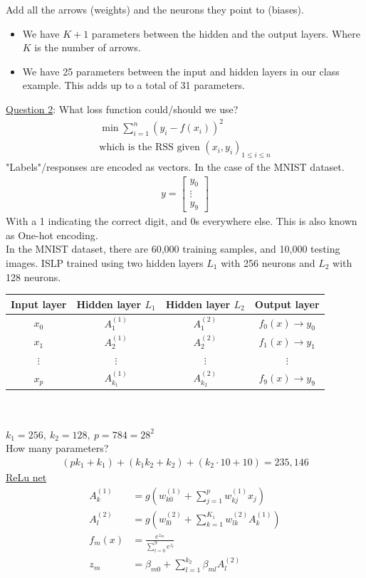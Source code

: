 \documentclass[12pt, letterpaper]{article}
\begin{document}
Add all the arrows (weights) and the neurons they point to (biases). 
\begin{itemize}
    \item We have $K + 1$ parameters between the hidden and the output layers. Where $K$ is 
    the number of arrows. 
    \item We have 25 parameters between the input and hidden layers in our class example. This
    adds up to a total of 31 parameters.
\end{itemize}
\underline{Question 2}: What loss function could/should we use?
\begin{align*}
    \min \sum_{i=1}^{n}(y_i - f(x_i))^2 \\
    \text{which is the RSS given } (x_i, y_i)_{1\le i \le n}
\end{align*}
"Labels"/responses are encoded as vectors. In the case of the MNIST dataset.
\begin{align*} y =
    \begin{bmatrix}
        y_0 \\ \vdots \\ y_9
    \end{bmatrix}
\end{align*}
With a 1 indicating the correct digit, and 0s everywhere else. This is also known as
One-hot encoding. \\ 
In the MNIST dataset, there are 60,000 training samples, and 10,000 testing images.
ISLP trained using two hidden layers $L_1$ with 256 neurons and $L_2$ with 128 neurons. \\

\begin{tabular}{c c c c}
    Input layer & Hidden layer $L_1$ & Hidden layer $L_2$ & Output layer \\
    \hline
    $x_0$ & $A_1^{(1)}$ & $A_1^{(2)}$ & $f_0(x) \rightarrow y_0$ \\
    $x_1$ & $A_2^{(1)}$ & $A_2^{(2)}$ & $f_1(x) \rightarrow y_1$ \\
    $\vdots$ & $\vdots$ & $\vdots$ & $\vdots$ \\
    $x_p$ & $A_{k_1}^{(1)}$ & $A_{k_2}^{(2)}$ & $f_9(x) \rightarrow y_9$
\end{tabular} \\ \\
$k_1 = 256,\ k_2 = 128,\ p = 784 = 28^2$ \\
How many parameters?
\begin{align*}
    (pk_1 + k_1) + (k_1k_2 + k_2) + (k_2\cdot 10 + 10) = 235,146
\end{align*}
\underline{ReLu net}
\begin{align*}
    A^{(1)}_k &= g\left(w_{k0}^{(1)}+ \sum_{j=1}^{p}w_{kj}^{(1)}x_j\right) \\
    A^{(2)}_l &= g\left(w_{l0}^{(2)}+ \sum_{k=1}^{K_1}w_{lk}^{(2)}A_k^{(1)}\right) \\
    f_m(x) &= \frac{e^{z_m}}{\sum_{l=0}^{9}e^{z_l}} \\
    z_m &= \beta_{m0} + \sum_{l=1}^{k_2} \beta_{ml}A_l^{(2)}
\end{align*}
\end{document}
